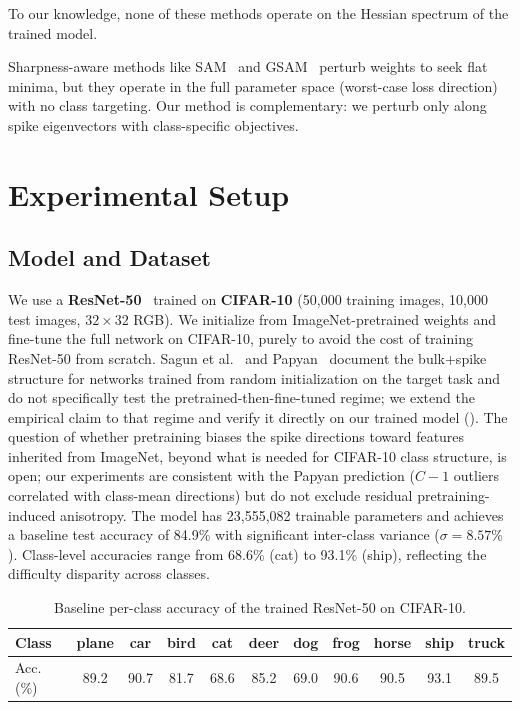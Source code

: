 \documentclass[11pt,a4paper]{article}
\begin{document}
To our knowledge, none of these methods operate on the Hessian spectrum
of the trained model.

Sharpness-aware methods like SAM~\cite{foret2021} and
GSAM~\cite{zhuang2022} perturb weights to seek flat minima, but they
operate in the full parameter space (worst-case loss direction) with no
class targeting. Our method is complementary: we perturb only along
spike eigenvectors with class-specific objectives.

\section{Experimental Setup}
\label{sec:setup}

\subsection{Model and Dataset}

We use a \textbf{ResNet-50}~\cite{he2016} trained on \textbf{CIFAR-10}
(50,000 training images, 10,000 test images, $32 \times 32$ RGB).
We initialize from ImageNet-pretrained weights and fine-tune the full
network on CIFAR-10, purely to avoid the cost of training ResNet-50
from scratch. Sagun et al.~\cite{sagun2017} and
Papyan~\cite{papyan2020} document the bulk+spike structure for
networks trained from random initialization on the target task and do
not specifically test the pretrained-then-fine-tuned regime; we extend
the empirical claim to that regime and verify it directly on our
trained model (). The question of whether
pretraining biases the spike directions toward features inherited from
ImageNet, beyond what is needed for CIFAR-10 class structure, is open;
our experiments are consistent with the Papyan prediction
($C{-}1$ outliers correlated with class-mean directions) but do not
exclude residual pretraining-induced anisotropy. The model has 23,555,082
trainable parameters and achieves a baseline test accuracy of 84.9\%
with significant inter-class variance ($\sigma = 8.57\%$). Class-level
accuracies range from 68.6\% (cat) to 93.1\% (ship), reflecting the
difficulty disparity across classes.

\begin{table}[ht]
\centering
\caption{Baseline per-class accuracy of the trained ResNet-50 on
CIFAR-10.}
\label{tab:baseline}
\begin{tabular}{lcccccccccc}
\toprule
Class & plane & car & bird & cat & deer & dog & frog & horse & ship & truck \\
\midrule
Acc.\,(\%) & 89.2 & 90.7 & 81.7 & 68.6 & 85.2 & 69.0 & 90.6 & 90.5 & 93.1 & 89.5 \\
\bottomrule
\end{tabular}
\end{table}
\end{document}
